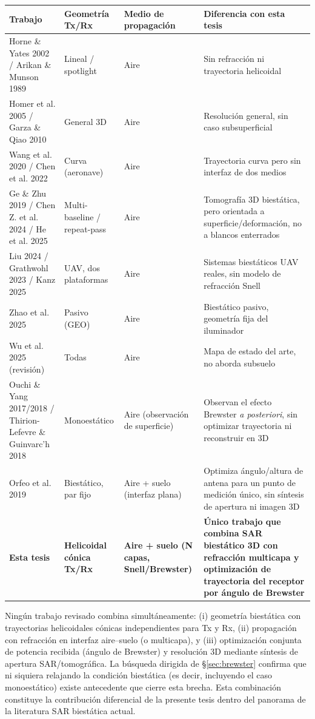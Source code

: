 \documentclass[11pt,a4paper]{article}
\begin{document}
\begin{longtable}{@{}p{3.6cm}p{3.2cm}p{3.2cm}p{5.3cm}@{}}
\toprule
\textbf{Trabajo} & \textbf{Geometría Tx/Rx} & \textbf{Medio de propagación} & \textbf{Diferencia con esta tesis} \\
\midrule
\endhead
Horne \& Yates 2002 / Arikan \& Munson 1989 & Lineal / spotlight & Aire & Sin refracción ni trayectoria helicoidal \\
Homer et al. 2005 / Garza \& Qiao 2010 & General 3D & Aire & Resolución general, sin caso subsuperficial \\
Wang et al. 2020 / Chen et al. 2022 & Curva (aeronave) & Aire & Trayectoria curva pero sin interfaz de dos medios \\
Ge \& Zhu 2019 / Chen Z. et al. 2024 / He et al. 2025 & Multi-baseline / repeat-pass & Aire & Tomografía 3D biestática, pero orientada a superficie/deformación, no a blancos enterrados \\
Liu 2024 / Grathwohl 2023 / Kanz 2025 & UAV, dos plataformas & Aire & Sistemas biestáticos UAV reales, sin modelo de refracción Snell \\
Zhao et al. 2025 & Pasivo (GEO) & Aire & Biestático pasivo, geometría fija del iluminador \\
Wu et al. 2025 (revisión) & Todas & Aire & Mapa de estado del arte, no aborda subsuelo \\
Ouchi \& Yang 2017/2018 / Thirion-Lefevre \& Guinvarc'h 2018 & Monoestático & Aire (observación de superficie) & Observan el efecto Brewster \emph{a posteriori}, sin optimizar trayectoria ni reconstruir en 3D \\
Orfeo et al. 2019 & Biestático, par fijo & Aire + suelo (interfaz plana) & Optimiza ángulo/altura de antena para un punto de medición único, sin síntesis de apertura ni imagen 3D \\
\textbf{Esta tesis} & \textbf{Helicoidal cónica Tx/Rx} & \textbf{Aire + suelo (N capas, Snell/Brewster)} & \textbf{Único trabajo que combina SAR biestático 3D con refracción multicapa y optimización de trayectoria del receptor por ángulo de Brewster} \\
\bottomrule
\end{longtable}

Ningún trabajo revisado combina simultáneamente: (i) geometría biestática
con trayectorias helicoidales cónicas independientes para Tx y Rx, (ii)
propagación con refracción en interfaz aire--suelo (o multicapa), y
(iii) optimización conjunta de potencia recibida (ángulo de Brewster) y
resolución 3D mediante síntesis de apertura SAR/tomográfica. La búsqueda
dirigida de \S\ref{sec:brewster} confirma que ni siquiera relajando la
condición biestática (es decir, incluyendo el caso monoestático) existe
antecedente que cierre esta brecha. Esta combinación constituye la
contribución diferencial de la presente tesis dentro del panorama de la
literatura SAR biestática actual.
\end{document}
